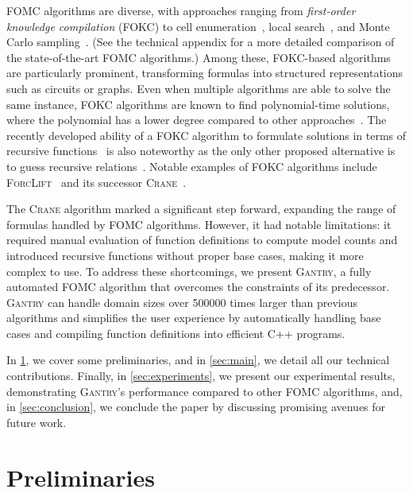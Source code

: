 \documentclass[a4paper,UKenglish,cleveref, autoref, thm-restate]{lipics-v2021}
\newcommand{\Cranetwo}{\textsc{Gantry}}
\begin{document}
FOMC algorithms are diverse, with approaches ranging from \emph{first-order
  knowledge compilation} (FOKC) to cell
enumeration~\cite{DBLP:conf/uai/BremenK21}, local
search~\cite{DBLP:journals/pvldb/NiuRDS11}, and Monte Carlo
sampling~\cite{DBLP:journals/cacm/GogateD16}. (See the technical appendix for a
more detailed comparison of the state-of-the-art FOMC algorithms.) Among these,
FOKC-based algorithms are particularly prominent, transforming formulas into
structured representations such as circuits or graphs. Even when multiple
algorithms are able to solve the same instance, FOKC algorithms are known to
find polynomial-time solutions, where the polynomial has a lower degree compared
to other approaches~\cite{DBLP:conf/kr/DilkasB23}. The recently developed
ability of a FOKC algorithm to formulate solutions in terms of recursive
functions~\cite{DBLP:conf/kr/DilkasB23} is also noteworthy as the only other
proposed alternative is to guess recursive
relations~\cite{DBLP:conf/ilp/BarvinekB0ZK21}. Notable examples of FOKC
algorithms include \textsc{ForcLift}~\cite{DBLP:conf/ijcai/BroeckTMDR11} and its
successor \textsc{Crane}~\cite{DBLP:conf/kr/DilkasB23}.


The \textsc{Crane} algorithm marked a significant step forward, expanding the
range of formulas handled by FOMC algorithms. However, it had notable
limitations: it required manual evaluation of function definitions to compute
model counts and introduced recursive functions without proper base cases,
making it more complex to use. To address these shortcomings, we present
\Cranetwo{}, a fully automated FOMC algorithm that overcomes the constraints of
its predecessor. \Cranetwo{} can handle domain sizes over \num{500000} times
larger than previous algorithms and simplifies the user experience by
automatically handling base cases and compiling function definitions into
efficient C++ programs.

In \cref{sec:preliminaries}, we cover some preliminaries, and in
\cref{sec:main}, we detail all our technical contributions. Finally, in
\cref{sec:experiments}, we present our experimental results, demonstrating
\Cranetwo{}'s performance compared to other FOMC algorithms, and, in
\cref{sec:conclusion}, we conclude the paper by discussing promising avenues for
future work.

\section{Preliminaries}\label{sec:preliminaries}
\end{document}
